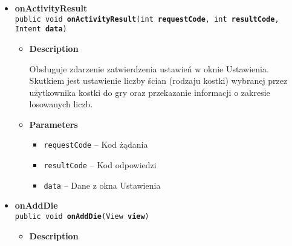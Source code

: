 \documentclass[11pt,a4paper]{article}
\begin{document}
{{{{{\begin{itemize}
{\begin{itemize}
{Obsługuje zdarzenie zmiany dokładności czujnika.
}
\item{
{\bf  Parameters}
  \begin{itemize}
   \item{
\texttt{sensor} -- Rodzaj czujnika}
   \item{
\texttt{accuracy} -- Dokładność}
  \end{itemize}
}%
\end{itemize}
}%
\item{ 
\hypertarget{com.example.kostkadogry.MainActivity.onActivityResult(int, int, Intent)}{{\bf  onActivityResult}\\}
\texttt{public void\ {\bf  onActivityResult}(\texttt{int} {\bf  requestCode},
\texttt{int} {\bf  resultCode},
\texttt{Intent} {\bf  data})
\label{com.example.kostkadogry.MainActivity.onActivityResult(int, int, Intent)}}%
\begin{itemize}
\item{
{\bf  Description}

Obsługuje zdarzenie zatwierdzenia ustawień w oknie Ustawienia. Skutkiem jest ustawienie liczby ścian (rodzaju kostki) wybranej przez użytkownika kostki do gry oraz przekazanie informacji o zakresie losowanych liczb.
}
\item{
{\bf  Parameters}
  \begin{itemize}
   \item{
\texttt{requestCode} -- Kod żądania}
   \item{
\texttt{resultCode} -- Kod odpowiedzi}
   \item{
\texttt{data} -- Dane z okna Ustawienia}
  \end{itemize}
}%
\end{itemize}
}%
\item{ 
\hypertarget{com.example.kostkadogry.MainActivity.onAddDie(View)}{{\bf  onAddDie}\\}
\texttt{public void\ {\bf  onAddDie}(\texttt{View} {\bf  view})
\label{com.example.kostkadogry.MainActivity.onAddDie(View)}}%
\begin{itemize}
\item{
{\bf  Description}

}
\end{itemize}}
\end{itemize}}}}}}
\end{document}
